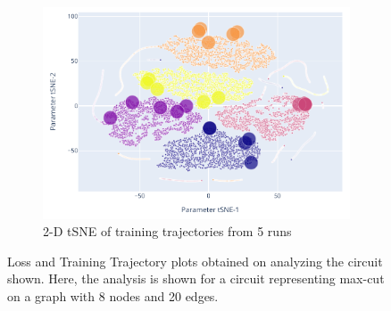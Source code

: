 \documentclass[%
 reprint,
 amsmath,
 amssymb,
 showkeys,
 pra,
 floatfix,
 onecolumn,
]{revtex4-2}
\begin{document}
\begin{figure}[htp]
\begin{subfigure}[b]{0.48\linewidth}
    \end{subfigure}
    \begin{subfigure}[b]{0.50\linewidth}
        \includegraphics[width=\textwidth]{images/supplementary-qleet-3.pdf}
        \caption{2-D tSNE of training trajectories from 5 runs}
    \end{subfigure}%
    \caption{Loss and Training Trajectory plots obtained on analyzing the circuit shown. Here, the analysis is shown for a circuit representing max-cut on a graph with 8 nodes and 20 edges.}
    \label{fig:loss-land-train-traj}
\end{figure}
\end{document}
